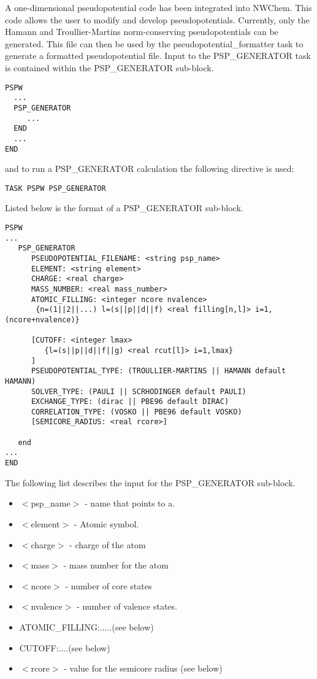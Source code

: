 A one-dimensional pseudopotential code has been integrated into NWChem.
This code allows the user to modify and develop pseudopotentials.  Currently, 
only the Hamann and Troullier-Martins norm-conserving pseudopotentials can be
generated.  This file can then be used by the pseudopotential\_formatter 
task to generate a formatted pseudopotential file. 
Input to the PSP\_GENERATOR task is contained
within the PSP\_GENERATOR sub-block.
\begin{verbatim}
PSPW
  ...
  PSP_GENERATOR
     ...
  END
  ...
END
\end{verbatim}
and to run a PSP\_GENERATOR calculation the following directive 
is used:
\begin{verbatim}
TASK PSPW PSP_GENERATOR
\end{verbatim}
Listed below is the format of a PSP\_GENERATOR sub-block.
\begin{verbatim}
PSPW
... 
   PSP_GENERATOR
      PSEUDOPOTENTIAL_FILENAME: <string psp_name>
      ELEMENT: <string element>
      CHARGE: <real charge>
      MASS_NUMBER: <real mass_number>
      ATOMIC_FILLING: <integer ncore nvalence>
       {n=(1||2||...) l=(s||p||d||f) <real filling[n,l]> i=1,(ncore+nvalence)}
      
      [CUTOFF: <integer lmax> 
         {l=(s||p||d||f||g) <real rcut[l]> i=1,lmax}
      ]
      PSEUDOPOTENTIAL_TYPE: (TROULLIER-MARTINS || HAMANN default HAMANN)
      SOLVER_TYPE: (PAULI || SCRHODINGER default PAULI)
      EXCHANGE_TYPE: (dirac || PBE96 default DIRAC)
      CORRELATION_TYPE: (VOSKO || PBE96 default VOSKO)
      [SEMICORE_RADIUS: <real rcore>]
      
   end
... 
END
\end{verbatim}
The following list describes the input for the PSP\_GENERATOR
sub-block.
\begin{itemize}

        \item $<$psp\_name$>$ - name that points to a.
        \item $<$element$>$ - Atomic symbol.
        \item $<$charge$>$ - charge of the atom
        \item $<$mass$>$ - mass number for the atom
        \item $<$ncore$>$ - number of core states
        \item $<$nvalence$>$ - number of valence states.
        \item ATOMIC\_FILLING:.....(see below)
        \item CUTOFF:....(see below) 
        \item $<$rcore$>$ - value for the semicore radius (see below) 
\end{itemize}


